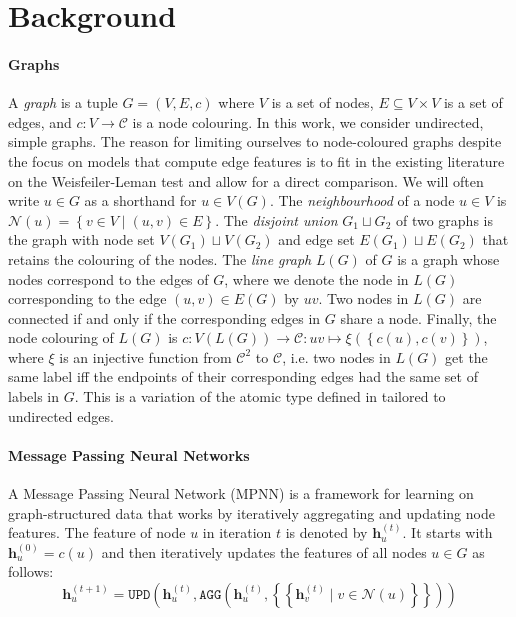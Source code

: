 \documentclass{article}
\newcommand{\set}[1]{\left\{#1\right\}}
\newcommand{\multiset}[1]{\left\{\!\!\left\{#1\right\}\!\!\right\}}
\newcommand{\iter}[1]{^{(#1)}}
\newcommand{\upd}{\texttt{UPD}}
\newcommand{\agg}{\texttt{AGG}}
\newcommand{\initdec}{\xi}
\newcommand{\nbh}{\mathcal{N}}
\newcommand{\bs}[1]{\boldsymbol{#1}}
\newcommand{\feat}{\bs{h}}
\newcommand{\mcc}{\mathcal{C}}
\begin{document}
\section{Background}    \label{sec:background}

\paragraph{Graphs}
A \emph{graph} is a tuple $G=(V,E,c)$ where $V$ is a set of nodes, $E\subseteq V\times V$ is a set of edges, and $c: V\rightarrow\mcc$ is a node colouring. In this work, we consider undirected, simple graphs.
The reason for limiting ourselves to node-coloured graphs despite the focus on models that compute edge features is to fit in the existing literature on the Weisfeiler-Leman test and allow for a direct comparison. We will often write $u\in G$ as a shorthand for $u\in V(G)$.
The \emph{neighbourhood} of a node $u\in V$ is $\nbh(u) = \set{v\in V \mid (u,v)\in E}$. The \emph{disjoint union} $G_1 \sqcup G_2$ of two graphs is the graph with node set $V(G_1) \sqcup V(G_2)$ and edge set $E(G_1) \sqcup E(G_2)$ that retains the colouring of the nodes.
The \emph{line graph} $L(G)$ of $G$ is a graph whose nodes correspond to the edges of $G$, where we denote the node in $L(G)$ corresponding to the edge $(u,v)\in E(G)$ by $uv$. Two nodes in $L(G)$ are connected if and only if the corresponding edges in $G$ share a node. Finally, the node colouring of $L(G)$ is $c: V(L(G)) \rightarrow \mcc: uv \mapsto \initdec(\set{c(u),c(v)})$, where $\initdec$ is an injective function from $\mcc^2$ to $\mcc$, i.e. two nodes in $L(G)$ get the same label iff the endpoints of their corresponding edges had the same set of labels in $G$. This is a variation of the atomic type defined in \cite{morris2019weisfeiler} tailored to undirected edges.

\paragraph{Message Passing Neural Networks}
A Message Passing Neural Network (MPNN) \cite{gilmer2017neural} is a framework for learning on graph-structured data that works by iteratively aggregating and updating node features. The feature of node $u$ in iteration $t$ is denoted by $\feat_u\iter{t}$. It starts with $\feat_u\iter{0} = c(u)$ and then iteratively updates the features of all nodes $u\in G$ as follows:
\begin{equation}
    \feat_u\iter{t+1}
    = \upd\left(\feat_u\iter{t},
    \agg\left(\feat_u\iter{t}, \multiset{\feat_v\iter{t} \mid v\in \nbh(u)}\right)\right)
\end{equation}
\end{document}
